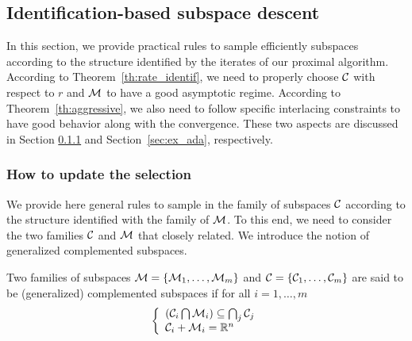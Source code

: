 \subsection{Identification-based subspace descent}\label{sec:adapt}

{
In this section, we provide practical rules to sample efficiently subspaces according to the structure identified by the iterates of our proximal algorithm. According to Theorem~\ref{th:rate_identif}, we need to properly choose $\mathcal{C}$ with respect to $r$ and $\mathcal{M}$ to have a good asymptotic regime. According to Theorem~\ref{th:aggressive},  we also need to follow specific interlacing constraints to have good behavior along with the convergence. These two aspects are discussed in Section \ref{sec:howto} and Section~\ref{sec:ex_ada}, respectively.}


\subsubsection{How to update the selection}
\label{sec:howto}

We provide here general rules to sample in the family of subspaces $\mathcal{C}$ according to the structure identified with the family of $\mathcal{M}$.
To this end, we need to consider the two families $\mathcal{C}$ and $\mathcal{M}$ that closely related. We introduce the notion of generalized {complemented subspaces}.

\begin{definition}
Two families of subspaces $\mathcal{M} = \{ \mathcal{M}_1,\ldots,\mathcal{M}_m\}$ and 
$\mathcal{C} = \{ \mathcal{C}_1,\ldots,\mathcal{C}_m\}$ are said to be (generalized)  {complemented subspaces} if for all $i=1,\ldots,m$
\[
  \left\{ \begin{array}{l}
    \left( \mathcal{C}_i \bigcap  \mathcal{M}_i  \right) \subseteq  \bigcap_j \mathcal{C}_j  \\
      \mathcal{C}_i  +  \mathcal{M}_i = \mathbb{R}^n
  \end{array} \right. 
\]
\end{definition}

